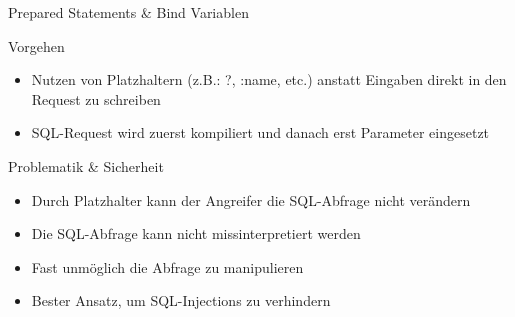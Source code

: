 \begin{frame}{Prepared Statements \& Bind Variablen}
\begin{block}{Vorgehen}
\begin{itemize}
\item Nutzen von Platzhaltern (z.B.: ?, :name, etc.) anstatt Eingaben direkt in den Request zu schreiben
\item SQL-Request wird zuerst kompiliert und danach erst Parameter eingesetzt
\end{itemize}
\end{block}
\begin{block}{Problematik \& Sicherheit}
\begin{itemize}
	\item Durch Platzhalter kann der Angreifer die SQL-Abfrage nicht verändern
	\item Die SQL-Abfrage kann nicht missinterpretiert werden
	\item Fast unmöglich die Abfrage zu manipulieren
	\item Bester Ansatz, um SQL-Injections zu verhindern
\end{itemize}
\end{block}
\end{frame}

